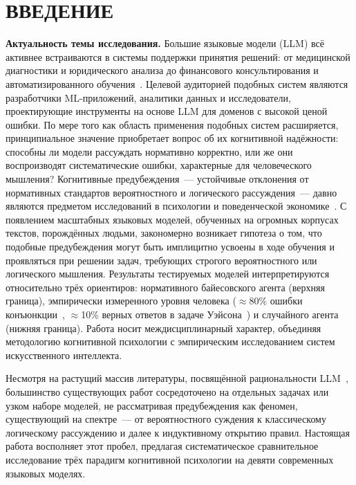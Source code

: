 \chapter*{ВВЕДЕНИЕ}
\sloppy

\textbf{Актуальность темы исследования.}
Большие языковые модели (LLM) всё активнее встраиваются в системы поддержки принятия решений: от медицинской диагностики и юридического анализа до финансового консультирования и автоматизированного обучения~\cite{bommasani2021opportunities}. Целевой аудиторией подобных систем являются разработчики ML-приложений, аналитики данных и исследователи, проектирующие инструменты на основе LLM для доменов с высокой ценой ошибки. По мере того как область применения подобных систем расширяется, принципиальное значение приобретает вопрос об их когнитивной надёжности: способны ли модели рассуждать нормативно корректно, или же они воспроизводят систематические ошибки, характерные для человеческого мышления? Когнитивные предубеждения~--- устойчивые отклонения от нормативных стандартов вероятностного и логического рассуждения~--- давно являются предметом исследований в психологии и поведенческой экономике~\cite{kahneman2011thinking}. С появлением масштабных языковых моделей, обученных на огромных корпусах текстов, порождённых людьми, закономерно возникает гипотеза о том, что подобные предубеждения могут быть имплицитно усвоены в ходе обучения и проявляться при решении задач, требующих строгого вероятностного или логического мышления. Результаты тестируемых моделей интерпретируются относительно трёх ориентиров: нормативного байесовского агента (верхняя граница), эмпирически измеренного уровня человека ($\approx$80\% ошибки конъюнкции~\cite{tversky1983extensional}, $\approx$10\% верных ответов в задаче Уэйсона~\cite{wason1966reasoning}) и случайного агента (нижняя граница). Работа носит междисциплинарный характер, объединяя методологию когнитивной психологии с эмпирическим исследованием систем искусственного интеллекта.

Несмотря на растущий массив литературы, посвящённой рациональности LLM~\cite{suri2024large, macmillan2024irrationality, coda2024cogbench}, большинство существующих работ сосредоточено на отдельных задачах или узком наборе моделей, не рассматривая предубеждения как феномен, существующий на спектре~--- от вероятностного суждения к классическому логическому рассуждению и далее к индуктивному открытию правил. Настоящая работа восполняет этот пробел, предлагая систематическое сравнительное исследование трёх парадигм когнитивной психологии на девяти современных языковых моделях.

